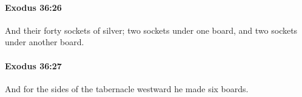 		\paragraph{Exodus 36:26} %
			\label{EXODUS-36-26}

			And their forty sockets of silver; two sockets under one board, and two sockets under another board.


		\paragraph{Exodus 36:27} %
			\label{EXODUS-36-27}

			And for the sides of the tabernacle westward he made six boards.


